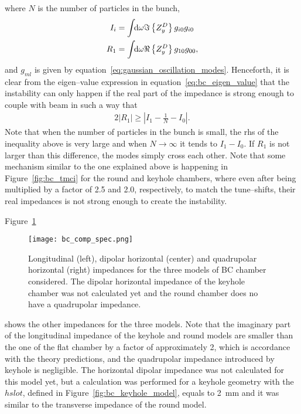      where $N$ is the number of particles in the bunch,
     \begin{subequations}
         \begin{align}
             I_i &= \int\!\!\text{d}\omega \Im\left\{Z^D_y\right\}g_{i0}g_{i0} \\
             R_1 &= \int\!\!\text{d}\omega \Re\left\{Z^D_y\right\}g_{10}g_{00},
         \end{align}
     \end{subequations}
     and $g_{ml}$ is given by equation~\eqref{eq:gaussian_oscillation_modes}. Henceforth, it is clear from the eigen--value expression in equation~\eqref{eq:bc_eigen_value} that the instability can only happen if the real part of the impedance is strong enough to couple with beam in such a way that
     \begin{align}
         2|R_1| \ge \left| I_1 - \frac1N - I_0 \right|.
     \end{align}
     Note that when the number of particles in the bunch is small, the \gls{rhs} of the inequality above is very large and when $N\to\infty$ it tends to $I_1-I_0$. If $R_1$ is not larger than this difference, the modes simply cross each other. Note that some mechanism similar to the one explained above is happening in Figure~\ref{fig:bc_tmci} for the round and keyhole chambers, where even after being multiplied by a factor of 2.5 and 2.0, respectively, to match the tune--shifts, their real impedances is not strong enough to create the instability.

     Figure~\ref{fig:bc_comp_spec}
     \begin{figure}
         \centering
         \texttt{[image: bc\_comp\_spec.png]}
         \caption[Comparison of impedances of different models of BC chamber.]{Longitudinal (left), dipolar horizontal (center) and quadrupolar horizontal (right) impedances for the three models of BC chamber considered. The dipolar horizontal impedance of the keyhole chamber was not calculated yet and the round chamber does no have a quadrupolar impedance.}
         \label{fig:bc_comp_spec}
     \end{figure}
     shows the other impedances for the three models. Note that the imaginary part of the longitudinal impedance of the keyhole and round models are smaller than the one of the flat chamber by a factor of approximately 2, which is accordance with the theory predictions, and the quadrupolar impedance introduced by keyhole is negligible. The horizontal dipolar impedance was not calculated for this model yet, but a calculation was performed for a keyhole geometry with the $hslot$, defined in Figure~\ref{fig:bc_keyhole_model}, equals to \SI{2}{\milli\meter} and it was similar to the transverse impedance of the round model.

